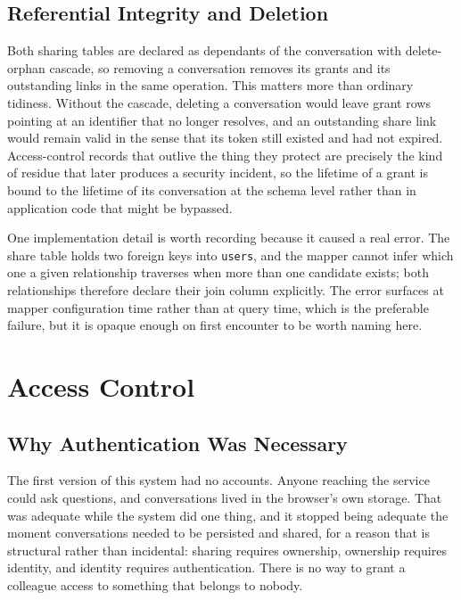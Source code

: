 \subsection{Referential Integrity and Deletion}

Both sharing tables are declared as dependants of the conversation with delete-orphan
cascade, so removing a conversation removes its grants and its outstanding links in the same
operation. This matters more than ordinary tidiness. Without the cascade, deleting a
conversation would leave grant rows pointing at an identifier that no longer resolves, and an
outstanding share link would remain valid in the sense that its token still existed and had
not expired. Access-control records that outlive the thing they protect are precisely the
kind of residue that later produces a security incident, so the lifetime of a grant is bound
to the lifetime of its conversation at the schema level rather than in application code that
might be bypassed.

One implementation detail is worth recording because it caused a real error. The share table
holds two foreign keys into \texttt{users}, and the mapper cannot infer which one a given
relationship traverses when more than one candidate exists; both relationships therefore
declare their join column explicitly. The error surfaces at mapper configuration time rather
than at query time, which is the preferable failure, but it is opaque enough on first
encounter to be worth naming here.

\section{Access Control}

\subsection{Why Authentication Was Necessary}

The first version of this system had no accounts. Anyone reaching the service could ask
questions, and conversations lived in the browser's own storage. That was adequate while the
system did one thing, and it stopped being adequate the moment conversations needed to be
persisted and shared, for a reason that is structural rather than incidental: sharing
requires ownership, ownership requires identity, and identity requires authentication. There
is no way to grant a colleague access to something that belongs to nobody.

